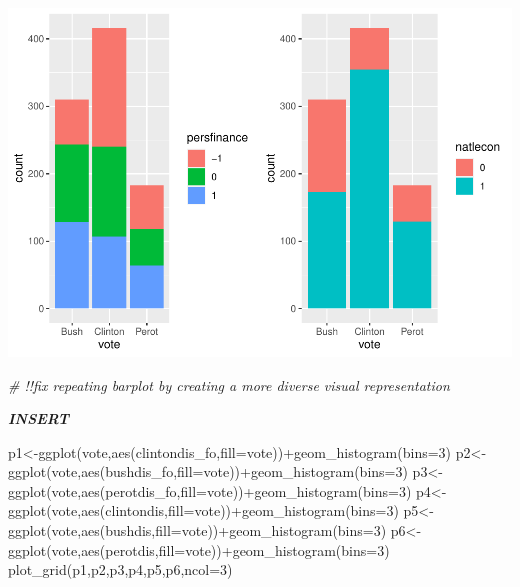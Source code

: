 \documentclass[
]{article}
\newenvironment{Shaded}{\begin{snugshade}}{\end{snugshade}}
\newcommand{\AttributeTok}[1]{\textcolor[rgb]{0.77,0.63,0.00}{#1}}
\newcommand{\CommentTok}[1]{\textcolor[rgb]{0.56,0.35,0.01}{\textit{#1}}}
\newcommand{\DecValTok}[1]{\textcolor[rgb]{0.00,0.00,0.81}{#1}}
\newcommand{\FunctionTok}[1]{\textcolor[rgb]{0.00,0.00,0.00}{#1}}
\newcommand{\NormalTok}[1]{#1}
\newcommand{\OtherTok}[1]{\textcolor[rgb]{0.56,0.35,0.01}{#1}}
\newcommand{\SpecialCharTok}[1]{\textcolor[rgb]{0.00,0.00,0.00}{#1}}
\begin{document}
\includegraphics{1992-US-election_files/figure-latex/unnamed-chunk-8-1.pdf}

\begin{Shaded}
\begin{Highlighting}[]
\CommentTok{\# !!fix repeating barplot by creating a more diverse visual representation}
\end{Highlighting}
\end{Shaded}

\textbf{\emph{INSERT}}

\begin{Shaded}
\begin{Highlighting}[]
\NormalTok{p1}\OtherTok{\textless{}{-}}\FunctionTok{ggplot}\NormalTok{(vote,}\FunctionTok{aes}\NormalTok{(clintondis\_fo,}\AttributeTok{fill=}\NormalTok{vote))}\SpecialCharTok{+}\FunctionTok{geom\_histogram}\NormalTok{(}\AttributeTok{bins=}\DecValTok{3}\NormalTok{)}
\NormalTok{p2}\OtherTok{\textless{}{-}}\FunctionTok{ggplot}\NormalTok{(vote,}\FunctionTok{aes}\NormalTok{(bushdis\_fo,}\AttributeTok{fill=}\NormalTok{vote))}\SpecialCharTok{+}\FunctionTok{geom\_histogram}\NormalTok{(}\AttributeTok{bins=}\DecValTok{3}\NormalTok{)}
\NormalTok{p3}\OtherTok{\textless{}{-}}\FunctionTok{ggplot}\NormalTok{(vote,}\FunctionTok{aes}\NormalTok{(perotdis\_fo,}\AttributeTok{fill=}\NormalTok{vote))}\SpecialCharTok{+}\FunctionTok{geom\_histogram}\NormalTok{(}\AttributeTok{bins=}\DecValTok{3}\NormalTok{)}
\NormalTok{p4}\OtherTok{\textless{}{-}}\FunctionTok{ggplot}\NormalTok{(vote,}\FunctionTok{aes}\NormalTok{(clintondis,}\AttributeTok{fill=}\NormalTok{vote))}\SpecialCharTok{+}\FunctionTok{geom\_histogram}\NormalTok{(}\AttributeTok{bins=}\DecValTok{3}\NormalTok{)}
\NormalTok{p5}\OtherTok{\textless{}{-}}\FunctionTok{ggplot}\NormalTok{(vote,}\FunctionTok{aes}\NormalTok{(bushdis,}\AttributeTok{fill=}\NormalTok{vote))}\SpecialCharTok{+}\FunctionTok{geom\_histogram}\NormalTok{(}\AttributeTok{bins=}\DecValTok{3}\NormalTok{)}
\NormalTok{p6}\OtherTok{\textless{}{-}}\FunctionTok{ggplot}\NormalTok{(vote,}\FunctionTok{aes}\NormalTok{(perotdis,}\AttributeTok{fill=}\NormalTok{vote))}\SpecialCharTok{+}\FunctionTok{geom\_histogram}\NormalTok{(}\AttributeTok{bins=}\DecValTok{3}\NormalTok{)}
\FunctionTok{plot\_grid}\NormalTok{(p1,p2,p3,p4,p5,p6,}\AttributeTok{ncol=}\DecValTok{3}\NormalTok{)}
\end{Highlighting}
\end{Shaded}
\end{document}
